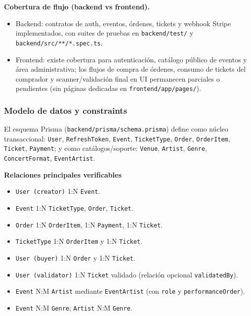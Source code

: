 \documentclass[
  11pt,
  a4paper,
  twoside=false,
  parskip=half               %
]{scrreprt}                  %
\providecommand{\tightlist}{%
  \setlength{\itemsep}{0pt}\setlength{\parskip}{0pt}}
\begin{document}
\textbf{Cobertura de flujo (backend vs frontend).}

\begin{itemize}
\tightlist
\item
  Backend: contratos de auth, eventos, órdenes, tickets y webhook Stripe
  implementados, con suites de pruebas en \texttt{backend/test/} y
  \texttt{backend/src/**/*.spec.ts}.
\item
  Frontend: existe cobertura para autenticación, catálogo público de
  eventos y área administrativa; los flujos de compra de órdenes,
  consumo de tickets del comprador y scanner/validación final en UI
  permanecen parciales o pendientes (sin páginas dedicadas en
  \texttt{frontend/app/pages/}).
\end{itemize}

\hypertarget{modelo-de-datos-y-constraints}{%
\subsubsection{Modelo de datos y
constraints}\label{modelo-de-datos-y-constraints}}

El esquema Prisma (\texttt{backend/prisma/schema.prisma}) define como
núcleo transaccional: \texttt{User}, \texttt{RefreshToken},
\texttt{Event}, \texttt{TicketType}, \texttt{Order}, \texttt{OrderItem},
\texttt{Ticket}, \texttt{Payment}; y como catálogos/soporte:
\texttt{Venue}, \texttt{Artist}, \texttt{Genre}, \texttt{ConcertFormat},
\texttt{EventArtist}.

\textbf{Relaciones principales verificables}

\begin{itemize}
\tightlist
\item
  \texttt{User\ (creator)} 1:N \texttt{Event}.
\item
  \texttt{Event} 1:N \texttt{TicketType}, \texttt{Order},
  \texttt{Ticket}.
\item
  \texttt{Order} 1:N \texttt{OrderItem}, 1:N \texttt{Payment}, 1:N
  \texttt{Ticket}.
\item
  \texttt{TicketType} 1:N \texttt{OrderItem} y 1:N \texttt{Ticket}.
\item
  \texttt{User\ (buyer)} 1:N \texttt{Order} y 1:N \texttt{Ticket}.
\item
  \texttt{User\ (validator)} 1:N \texttt{Ticket} validado (relación
  opcional \texttt{validatedBy}).
\item
  \texttt{Event} N:M \texttt{Artist} mediante \texttt{EventArtist} (con
  \texttt{role} y \texttt{performanceOrder}).
\item
  \texttt{Event} N:M \texttt{Genre}; \texttt{Artist} N:M \texttt{Genre}.
\end{itemize}
\end{document}
